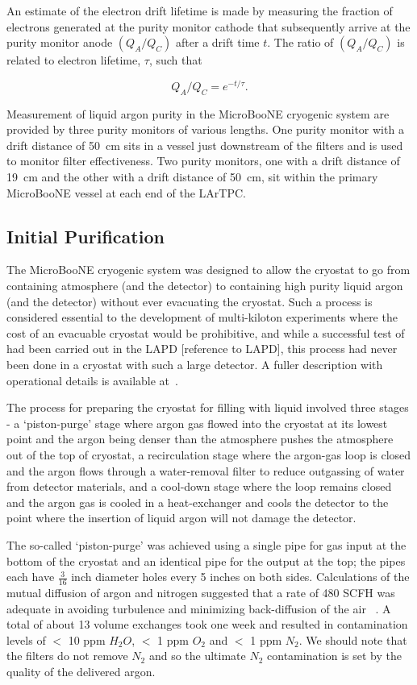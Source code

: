 An estimate of the electron drift lifetime is made by measuring the fraction of electrons generated at the purity monitor cathode that subsequently arrive at the purity monitor anode $(Q_A/Q_C)$ after a drift time $t$. The ratio of $(Q_A/Q_C)$ is related to electron lifetime, $\tau$, such that

\begin{equation}
Q_A/Q_C = e^{-t/\tau}.
\end{equation}

Measurement of liquid argon purity in the MicroBooNE cryogenic system are provided by three purity monitors of various lengths. One purity monitor with a drift distance of 50~cm sits in a vessel just downstream of the filters and is used to monitor filter effectiveness. Two purity monitors, one with a drift distance of 19~cm and the other with a drift distance of 50~cm, sit within the primary MicroBooNE vessel at each end of the LArTPC.


 \subsection{Initial Purification}
 The MicroBooNE cryogenic system was designed to allow the cryostat to go from containing atmosphere (and the detector) to containing high purity liquid argon (and the detector) without ever evacuating the cryostat. Such a process is considered essential to the development of multi-kiloton experiments where the cost of an evacuable cryostat would be prohibitive, and while a successful test of had been carried out in the LAPD [reference to LAPD], this process had never been done in a cryostat with such a large detector.  A fuller description with operational details is available at~\cite{MZuck_talk}.

The process for preparing the cryostat for filling with liquid involved three stages - a `piston-purge' stage where argon gas flowed into the cryostat at its lowest point and the argon being denser than the atmosphere pushes the atmosphere out of the top of cryostat, a recirculation stage where the argon-gas loop is closed and the argon flows through a water-removal filter to reduce outgassing of water from detector materials, and a cool-down stage where the loop remains closed and the argon gas is cooled in a heat-exchanger and cools the detector to the point where the insertion of liquid argon will not damage the detector.

The so-called `piston-purge' was achieved using a single pipe for gas input at the bottom of the cryostat and an identical pipe for the output at the top; the pipes each have $\frac{3}{16}$ inch diameter holes every 5 inches on both sides.  Calculations of the mutual diffusion of argon and nitrogen suggested that a rate of 480 SCFH was adequate in avoiding turbulence and minimizing back-diffusion of the air ~\cite{EVoirin_purge}. A total of about 13 volume exchanges took one week and resulted in contamination levels of $<$ 10 ppm $H_2 O$, $<$ 1 ppm $O_2$ and $<$ 1 ppm $N_2$. We should note that the filters do not remove $N_2$ and so the ultimate $N_2$ contamination  is set by the quality of the delivered argon. 

